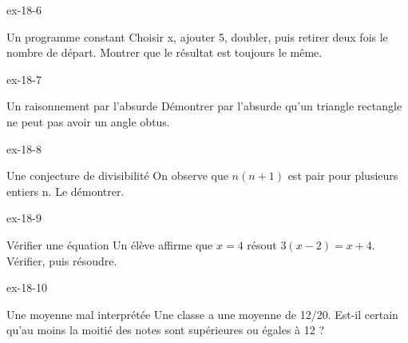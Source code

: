 \clearpage{}
\begin{blocLivre}{ex-18-6}\begin{exercice}[2]{Un programme constant}
Choisir x, ajouter 5, doubler, puis retirer deux fois le nombre de départ. Montrer que le résultat est toujours le même.
\end{exercice}\end{blocLivre}
\begin{blocLivre}{ex-18-7}\begin{exercice}[2]{Un raisonnement par l’absurde}
Démontrer par l’absurde qu’un triangle rectangle ne peut pas avoir un angle obtus.
\end{exercice}\end{blocLivre}
\begin{blocLivre}{ex-18-8}\begin{exercice}[2]{Une conjecture de divisibilité}
On observe que $n(n+1)$ est pair pour plusieurs entiers n. Le démontrer.
\end{exercice}\end{blocLivre}
\begin{blocLivre}{ex-18-9}\begin{exercice}[2]{Vérifier une équation}
Un élève affirme que $x=4$ résout $3(x-2)=x+4$. Vérifier, puis résoudre.
\end{exercice}\end{blocLivre}
\begin{blocLivre}{ex-18-10}\begin{exercice}[2]{Une moyenne mal interprétée}
Une classe a une moyenne de 12/20. Est-il certain qu’au moins la moitié des notes sont supérieures ou égales à 12 ?
\end{exercice}\end{blocLivre}


